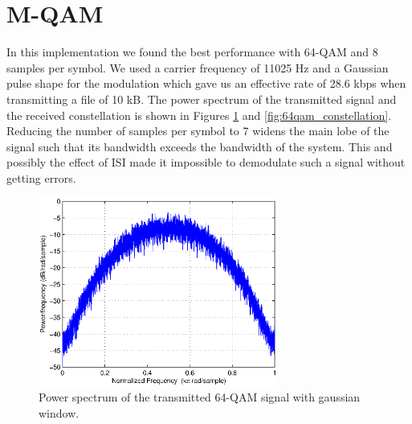 \documentclass[12pt,a4paper,openright]{report}
\begin{document}
\section{M-QAM}

In this implementation we found the best performance with 64-QAM and 8 samples per symbol. We used a carrier frequency of 11025 Hz and a Gaussian pulse shape for the modulation which gave us an effective rate of 28.6 kbps when transmitting a file of 10 kB. The power spectrum of the transmitted signal and the received constellation is shown in Figures \ref{fig:qam_spectrum} and \ref{fig:64qam_constellation}. Reducing the number of samples per symbol to 7 widens the main lobe of the signal such that its bandwidth exceeds the bandwidth of the system. This and possibly the effect of ISI made it impossible to demodulate such a signal without getting errors.

\begin{figure}[H]
  \centering
    \includegraphics[width=0.7\textwidth]{64QAMspectrum.eps}
    \caption[64-QAM spectrum]{Power spectrum of the transmitted 64-QAM signal with gaussian window.}
    \label{fig:qam_spectrum}
\end{figure}
\end{document}
